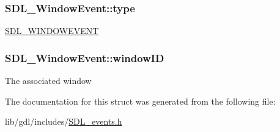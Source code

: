 \subsubsection[{type}]{ S\+D\+L\+\_\+\+Window\+Event\+::type}\label{struct_s_d_l___window_event_a01c8c8fbe8564e690f958d2db560f657}
\hyperlink{_s_d_l__events_8h_a3b589e89be6b35c02e0dd34a55f3fccaa5ff4e41f0d8b5def11cfe6a69ec0b698}{S\+D\+L\+\_\+\+W\+I\+N\+D\+O\+W\+E\+V\+E\+N\+T} \hypertarget{struct_s_d_l___window_event_a4b31796ffc84fbb7f6e9ba33e127619a}{}
\subsubsection[{window\+I\+D}]{ S\+D\+L\+\_\+\+Window\+Event\+::window\+I\+D}\label{struct_s_d_l___window_event_a4b31796ffc84fbb7f6e9ba33e127619a}
The associated window 

The documentation for this struct was generated from the following file\+:\begin{DoxyCompactItemize}
\item 
lib/gdl/includes/\hyperlink{_s_d_l__events_8h}{S\+D\+L\+\_\+events.\+h}\end{DoxyCompactItemize}
